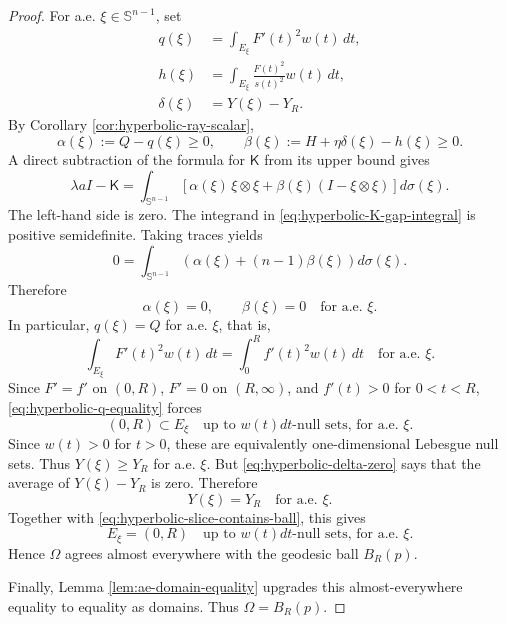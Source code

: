 \documentclass[10pt,a4paper]{amsart}
\newcommand{\Sn}{\mathbb S}
\newcommand{\Id}{I}
\newcommand{\mcK}{\mathsf K}
\begin{document}
\begin{proof}
For a.e. $\xi\in\Sn^{n-1}$, set
\begin{align*}
        q(\xi)&=\int_{E_\xi}F'(t)^2w(t)\,dt,\\
        h(\xi)&=\int_{E_\xi}\frac{F(t)^2}{s(t)^2}w(t)\,dt,\\
        \delta(\xi)&=Y(\xi)-Y_R.
\end{align*}
By Corollary \ref{cor:hyperbolic-ray-scalar},
$$
        \alpha(\xi):=Q-q(\xi)\ge0,
        \qquad
        \beta(\xi):=H+\eta\delta(\xi)-h(\xi)\ge0.
$$
A direct subtraction of the formula for $\mcK$ from its upper bound gives
\begin{equation}\label{eq:hyperbolic-K-gap-integral}
        \lambda a\Id-\mcK
        =\int_{\Sn^{n-1}}
        \left[\alpha(\xi)\,\xi\otimes\xi+\beta(\xi)(\Id-\xi\otimes\xi)\right]d\sigma(\xi).
\end{equation}
The left-hand side is zero.  The integrand in \eqref{eq:hyperbolic-K-gap-integral} is positive semidefinite.  Taking traces yields
$$
        0=\int_{\Sn^{n-1}}\left(\alpha(\xi)+(n-1)\beta(\xi)\right)d\sigma(\xi).
$$
Therefore
\begin{equation}\label{eq:hyperbolic-alpha-beta-zero}
        \alpha(\xi)=0,
        \qquad
        \beta(\xi)=0
        \quad\text{for a.e. }\xi.
\end{equation}
In particular, $q(\xi)=Q$ for a.e. $\xi$, that is,
\begin{equation}\label{eq:hyperbolic-q-equality}
        \int_{E_\xi}F'(t)^2w(t)\,dt
        =\int_0^R f'(t)^2w(t)\,dt
        \quad\text{for a.e. }\xi.
\end{equation}
Since $F'=f'$ on $(0,R)$, $F'=0$ on $(R,\infty)$, and $f'(t)>0$ for $0<t<R$, \eqref{eq:hyperbolic-q-equality} forces
\begin{equation}\label{eq:hyperbolic-slice-contains-ball}
        (0,R)\subset E_\xi
        \quad\text{up to }w(t)dt\text{-null sets, for a.e. }\xi.
\end{equation}
Since $w(t)>0$ for $t>0$, these are equivalently one-dimensional Lebesgue null sets.  Thus $Y(\xi)\ge Y_R$ for a.e. $\xi$.  But \eqref{eq:hyperbolic-delta-zero} says that the average of $Y(\xi)-Y_R$ is zero.  Therefore
$$
        Y(\xi)=Y_R
        \quad\text{for a.e. }\xi.
$$
Together with \eqref{eq:hyperbolic-slice-contains-ball}, this gives
$$
        E_\xi=(0,R)
        \quad\text{up to }w(t)dt\text{-null sets, for a.e. }\xi.
$$
Hence $\Omega$ agrees almost everywhere with the geodesic ball $B_R(p)$.

Finally, Lemma \ref{lem:ae-domain-equality} upgrades this almost-everywhere equality to equality as domains.  Thus $\Omega=B_R(p)$.
\end{proof}
\end{document}
